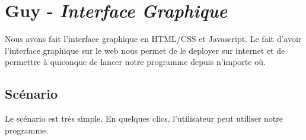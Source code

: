 \chapter{Guy - \emph{Interface Graphique}}

Nous avons fait l'interface graphique en HTML/CSS et Javascript. Le fait d'avoir
l'interface graphique sur le web nous permet de le deployer sur internet et de
permettre à quiconque de lancer notre programme depuis n'importe où.

\section{Scénario}

Le scénario est très simple. En quelques clics, l'utilisateur peut utiliser
notre programme.

